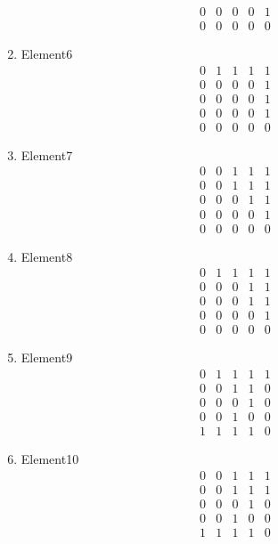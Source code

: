 \documentclass[12pt]{article}
\begin{document}
\begin{multicols}{3}
\begin{enumerate}
\begin{equation*}
\begin{array}{ccccc}
0&0&0&0&1\\
0&0&0&0&0
\end{array}
\end{equation*}
\item Element6
\begin{equation*}
\begin{array}{ccccc}
0&1&1&1&1\\
0&0&0&0&1\\
0&0&0&0&1\\
0&0&0&0&1\\
0&0&0&0&0
\end{array}
\end{equation*}
\item Element7
\begin{equation*}
\begin{array}{ccccc}
0&0&1&1&1\\
0&0&1&1&1\\
0&0&0&1&1\\
0&0&0&0&1\\
0&0&0&0&0
\end{array}
\end{equation*}
\item Element8
\begin{equation*}
\begin{array}{ccccc}
0&1&1&1&1\\
0&0&0&1&1\\
0&0&0&1&1\\
0&0&0&0&1\\
0&0&0&0&0
\end{array}
\end{equation*}
\item Element9
\begin{equation*}
\begin{array}{ccccc}
0&1&1&1&1\\
0&0&1&1&0\\
0&0&0&1&0\\
0&0&1&0&0\\
1&1&1&1&0
\end{array}
\end{equation*}
\item Element10
\begin{equation*}
\begin{array}{ccccc}
0&0&1&1&1\\
0&0&1&1&1\\
0&0&0&1&0\\
0&0&1&0&0\\
1&1&1&1&0
\end{array}

\end{equation*}
\end{enumerate}
\end{multicols}
\end{document}
